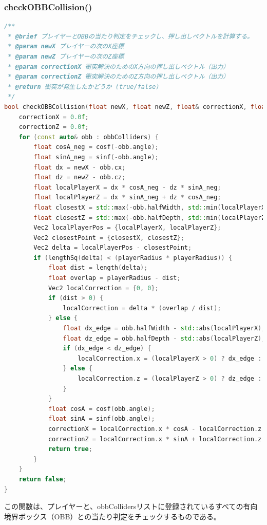 \documentclass[uplatex,dvipdfmx,a4paper]{jsarticle}
\begin{document}
\hypertarget{func:checkOBBCollision}{}\subsubsection{checkOBBCollision()}\label{func:checkOBBCollision}
\begin{lstlisting}[language=C++, caption={checkOBBCollision() 関数}, label={lst:checkOBBCollision_detail}]
/**
 * @brief プレイヤーとOBBの当たり判定をチェックし、押し出しベクトルを計算する。
 * @param newX プレイヤーの次のX座標
 * @param newZ プレイヤーの次のZ座標
 * @param correctionX 衝突解決のためのX方向の押し出しベクトル（出力）
 * @param correctionZ 衝突解決のためのZ方向の押し出しベクトル（出力）
 * @return 衝突が発生したかどうか (true/false)
 */
bool checkOBBCollision(float newX, float newZ, float& correctionX, float& correctionZ) {
    correctionX = 0.0f;
    correctionZ = 0.0f;
    for (const auto& obb : obbColliders) {
        float cosA_neg = cosf(-obb.angle);
        float sinA_neg = sinf(-obb.angle);
        float dx = newX - obb.cx;
        float dz = newZ - obb.cz;
        float localPlayerX = dx * cosA_neg - dz * sinA_neg;
        float localPlayerZ = dx * sinA_neg + dz * cosA_neg;
        float closestX = std::max(-obb.halfWidth, std::min(localPlayerX, obb.halfWidth));
        float closestZ = std::max(-obb.halfDepth, std::min(localPlayerZ, obb.halfDepth));
        Vec2 localPlayerPos = {localPlayerX, localPlayerZ};
        Vec2 closestPoint = {closestX, closestZ};
        Vec2 delta = localPlayerPos - closestPoint;
        if (lengthSq(delta) < (playerRadius * playerRadius)) {
            float dist = length(delta);
            float overlap = playerRadius - dist;
            Vec2 localCorrection = {0, 0};
            if (dist > 0) {
                localCorrection = delta * (overlap / dist);
            } else {
                float dx_edge = obb.halfWidth - std::abs(localPlayerX);
                float dz_edge = obb.halfDepth - std::abs(localPlayerZ);
                if (dx_edge < dz_edge) {
                    localCorrection.x = (localPlayerX > 0) ? dx_edge : -dx_edge;
                } else {
                    localCorrection.z = (localPlayerZ > 0) ? dz_edge : -dz_edge;
                }
            }
            float cosA = cosf(obb.angle);
            float sinA = sinf(obb.angle);
            correctionX = localCorrection.x * cosA - localCorrection.z * sinA;
            correctionZ = localCorrection.x * sinA + localCorrection.z * cosA;
            return true;
        }
    }
    return false;
}
\end{lstlisting}
この関数は、プレイヤーと、obbCollidersリストに登録されているすべての有向境界ボックス（OBB）との当たり判定をチェックするものである。
\end{document}
